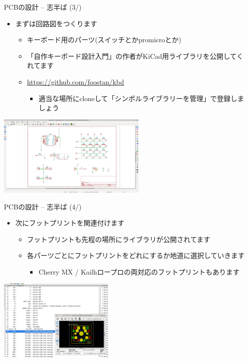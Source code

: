 \documentclass[cjk,dvipdfmx,10pt,compress,fragile%
hyperref={bookmarks=true,bookmarksnumbered=true,bookmarksopen=false,%
colorlinks=false,%
pdftitle={第 134 回 関西 Debian 勉強会},%
pdfauthor={小林},%
pdfsubject={資料},%
}]{beamer}
\begin{document}
\begin{frame}[fragile,t]{PCBの設計 -- 志半ば (3/)}
 \begin{itemize}
  \item まずは回路図をつくります
	\begin{itemize}
	 \item キーボード用のパーツ(スイッチとかpromicroとか)
	 \item 「自作キーボード設計入門」の作者がKiCad用ライブラリを公開してくれてます
	 \item \url{https://github.com/foostan/kbd}
	       \begin{itemize}
		\item 適当な場所にcloneして「シンボルライブラリーを管理」で登録しましょう
	       \end{itemize}
	\end{itemize}
 \end{itemize}
 \begin{center}
  \includegraphics[keepaspectratio,height=4cm]{./img/kicad-schematic.png}
 \end{center}
\end{frame}

\begin{frame}[fragile,t]{PCBの設計 -- 志半ば (4/)}
 \begin{itemize}
  \item 次にフットプリントを関連付けます
	\begin{itemize}
	 \item フットプリントも先程の場所にライブラリが公開されてます
	 \item 各パーツごとにフットプリントをどれにするか地道に選択していきます
	       \begin{itemize}
		\item Cherry MX / Kailhロープロの両対応のフットプリントもあります
	       \end{itemize}
	\end{itemize}
 \end{itemize}
 \begin{center}
  \includegraphics[keepaspectratio,height=4cm]{./img/kicad-footprint.png}
 \end{center}
\end{frame}
\end{document}
